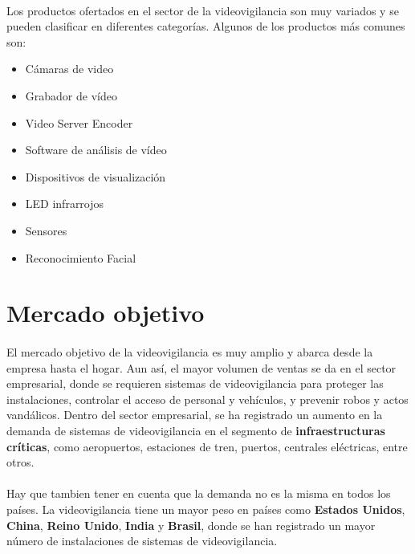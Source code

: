 \documentclass{report}
\begin{document}
        \paragraph*{}
        {
          Los productos ofertados en el sector de la videovigilancia son muy variados y se pueden clasificar en diferentes categorías. Algunos de los productos más comunes son: \cite{wiki-videovigilancia-ip}
        }
        \begin{multicols}{2}
          \begin{itemize}
            \item Cámaras de video
            \item Grabador de vídeo 
            \item Video Server Encoder
            \item Software de análisis de vídeo
            \item Dispositivos de visualización
            \item LED infrarrojos
            \item Sensores
            \item Reconocimiento Facial
          \end{itemize}
        \end{multicols}
        
      \section{Mercado objetivo}
        \paragraph*{}
        {
          El mercado objetivo de la videovigilancia es muy amplio y abarca desde la empresa hasta el hogar. 
          Aun así, el mayor volumen de ventas se da en el sector empresarial, donde se requieren sistemas de videovigilancia para proteger las instalaciones, controlar el acceso de personal y vehículos, y prevenir robos y actos vandálicos.
          Dentro del sector empresarial, se ha registrado un aumento en la demanda de sistemas de videovigilancia en el segmento de \textbf{infraestructuras críticas}, como aeropuertos, estaciones de tren, puertos, centrales eléctricas, entre otros.\cite{mordor-video-surveillance}
        }
        \paragraph*{}
        {
          Hay que tambien tener en cuenta que la demanda no es la misma en todos los países. La videovigilancia tiene un mayor peso en países como \textbf{Estados Unidos}, \textbf{China}, \textbf{Reino Unido}, \textbf{India} y \textbf{Brasil}, donde se han registrado un mayor número de instalaciones de sistemas de videovigilancia.\cite{mordor-video-surveillance}
        }
\end{document}
